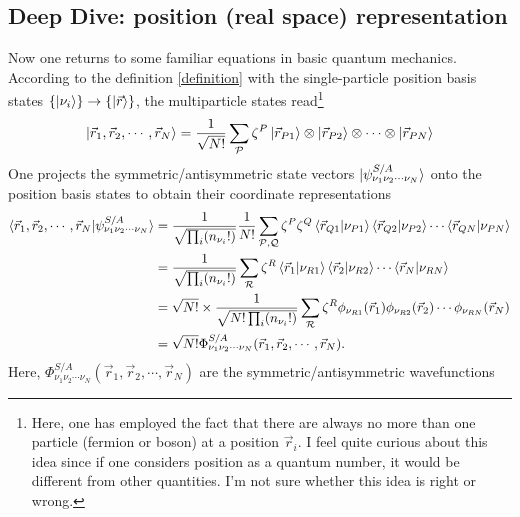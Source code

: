 \documentclass[a4paper,12pts]{article}
\numberwithin{equation}{section}
\begin{document}
	\subsection{Deep Dive: position (real space) representation}
	Now one returns to some familiar equations in basic quantum mechanics. According to the definition \ref{definition} with the single-particle position basis states $\{\ket{\nu_i}\} \rightarrow \{\ket{\vec{r}}\}$, the multiparticle states read\footnote{Here, one has employed the fact that there are always no more than one particle (fermion or boson) at a position $\vec{r}_i$. I feel quite curious about this idea since if one considers position as a quantum number, it would be different from other quantities. I'm not sure whether this idea is right or wrong.}
	\begin{equation}
	\ket{\vec{r}_1,\vec{r}_2,\cdots,\vec{r}_N} = \frac{1}{\sqrt{N!}}\sum_{\mathcal{P}}\zeta^{P}\ket{\vec{r}_{P1}}\otimes\ket{\vec{r}_{P2}}\otimes\cdots\otimes\ket{\vec{r}_{PN}}
	\end{equation}
	One projects the symmetric/antisymmetric state vectors $\ket{\psi_{\nu_1\nu_2\cdots\nu_N}^{S/A}}$ onto the position basis states to obtain their coordinate representations
	\begin{align}
	\braket{\vec{r}_1,\vec{r}_2,\cdots,\vec{r}_N|\psi_{\nu_1\nu_2\cdots\nu_N}^{S/A}} &= \frac{1}{\sqrt{\prod_{i}(n_{\nu_i}!)}}\frac{1}{N!}\sum_{\mathcal{P},\mathcal{Q}}\zeta^P\zeta^Q\braket{\vec{r}_{Q1}|\nu_{P1}}\braket{\vec{r}_{Q2}|\nu_{P2}}\cdots\braket{\vec{r}_{QN}|\nu_{PN}}\\
	&= \frac{1}{\sqrt{\prod_{i}(n_{\nu_i}!)}}\sum_{\mathcal{R}}\zeta^R\braket{\vec{r}_1|\nu_{R1}}\braket{\vec{r}_2|\nu_{R2}}\cdots\braket{\vec{r}_N|\nu_{RN}}\\
	&= \sqrt{N!}\times\frac{1}{\sqrt{N!\prod_{i}(n_{\nu_i}!)}}\sum_{\mathcal{R}}\zeta^R\phi_{\nu_{R1}}(\vec{r}_1)\phi_{\nu_{R2}}(\vec{r}_2)\cdots\phi_{\nu_{RN}}(\vec{r}_N)\\
	&= \sqrt{N!}\Phi_{\nu_1\nu_2\cdots\nu_N}^{S/A}(\vec{r}_1,\vec{r}_2,\cdots,\vec{r}_N).\label{random}
	\end{align}
	Here, $\Phi_{\nu_1\nu_2\cdots\nu_N}^{S/A}(\vec{r}_1,\vec{r}_2,\cdots,\vec{r}_N)$ are the symmetric/antisymmetric wavefunctions
\end{document}
